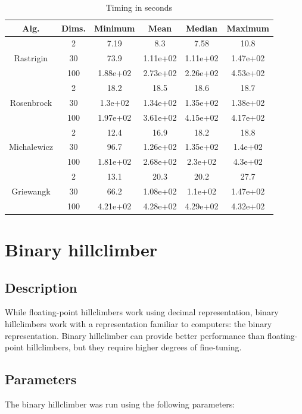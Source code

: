 \documentclass[conference]{IEEEtran}
\begin{document}
\begin{table}[!htbp]
    \caption{Timing in seconds}
    \centering
    \begin{tabular}{|c c|c c c c|}
        \hline
        Alg. & Dims. & Minimum & Mean & Median & Maximum \\
        \hline
        \multirow{3}{*}{Rastrigin} & 2 & 7.19 & 8.3 & 7.58 & 10.8 \\
        & 30 & 73.9 & 1.11e+02 & 1.11e+02 & 1.47e+02 \\
        & 100 & 1.88e+02 & 2.73e+02 & 2.26e+02 & 4.53e+02 \\
        \hline
        \multirow{3}{*}{Rosenbrock} & 2 & 18.2 & 18.5 & 18.6 & 18.7 \\
        & 30 & 1.3e+02 & 1.34e+02 & 1.35e+02 & 1.38e+02 \\
        & 100 & 1.97e+02 & 3.61e+02 & 4.15e+02 & 4.17e+02 \\
        \hline
        \multirow{3}{*}{Michalewicz} & 2 & 12.4 & 16.9 & 18.2 & 18.8 \\
        & 30 & 96.7 & 1.26e+02 & 1.35e+02 & 1.4e+02 \\
        & 100 & 1.81e+02 & 2.68e+02 & 2.3e+02 & 4.3e+02 \\
        \hline
        \multirow{3}{*}{Griewangk} & 2 & 13.1 & 20.3 & 20.2 & 27.7 \\
        & 30 & 66.2 & 1.08e+02 & 1.1e+02 & 1.47e+02 \\
        & 100 & 4.21e+02 & 4.28e+02 & 4.29e+02 & 4.32e+02 \\
        \hline
    \end{tabular}
\end{table}


\section{Binary hillclimber}

\subsection{Description}
While floating-point hillclimbers work using decimal representation, binary hillclimbers work with a representation familiar
to computers: the binary representation. Binary hillclimber can provide better performance than floating-point hillclimbers,
but they require higher degrees of fine-tuning.

\subsection{Parameters}
The binary hillclimber was run using the following parameters:
\end{document}
